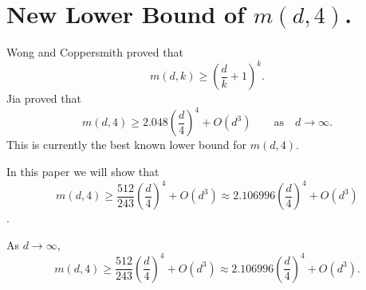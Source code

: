 \section{ New Lower Bound of $m(d, 4)$.}
Wong and Coppersmith proved that
\[m(d, k) \geq \left (\frac{d}{k} + 1\right)^k.\]
Jia proved that 
\[ 
m(d, 4) \geq2.048 \left(\frac{d}{4}\right)^4  +O(d^3)\qquad\text{as}\quad d\to\infty.
\]
This is currently the best known lower bound for $m(d, 4)$. 

In this paper we will show that \[m(d,4) \geq \frac{512}{243}\left(\frac d4\right)^4 + O(d^3)\approx 2.106996 \left(\frac d4\right)^4 + O(d^3)\].
\begin{theorem} As $d\to\infty$, 
\[
m(d,4) \geq \frac{512}{243}\left(\frac d4\right)^4 + O(d^3)\approx 2.106996 \left(\frac d4\right)^4 + O(d^3).
\]
\end{theorem}

